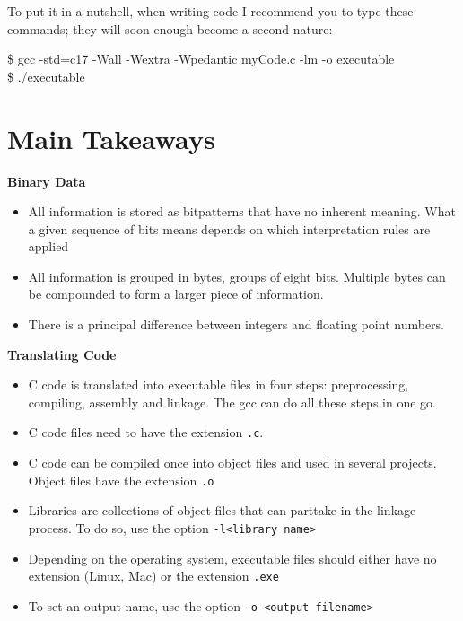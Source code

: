 To put it in a nutshell, when writing code I recommend you to type these commands; they will soon enough become a second nature:
\begin{cmdbox}
\$ gcc -std=c17 -Wall -Wextra -Wpedantic myCode.c -lm -o executable \\
\$ ./executable
\end{cmdbox}

\section{Main Takeaways} 
\begin{defbox}
\textbf{Binary Data}
\begin{itemize}
\item All information is stored as bitpatterns that have no inherent meaning. What a given sequence of bits means depends on which interpretation rules are applied
\item All information is grouped in bytes, \ie groups of eight bits. Multiple bytes can be compounded to form a larger piece of information.
\item There is a principal difference between integers and floating point numbers.
\end{itemize}

\textbf{Translating Code}
\begin{itemize}
\item C code is translated into executable files in four steps: preprocessing, compiling, assembly and linkage. The gcc can do all these steps in one go.
\item C code files need to have the extension \texttt{.c}.
\item C code can be compiled once into object files and used in several projects. Object files have the extension \texttt{.o}
\item Libraries are collections of object files that can parttake in the linkage process. To do so, use the option \texttt{-l<library name>}
\item Depending on the operating system, executable files should either have no extension (Linux, Mac) or the extension \texttt{.exe}
\item To set an output name, use the option \texttt{-o <output filename>}
\end{itemize}
\end{defbox}
%
